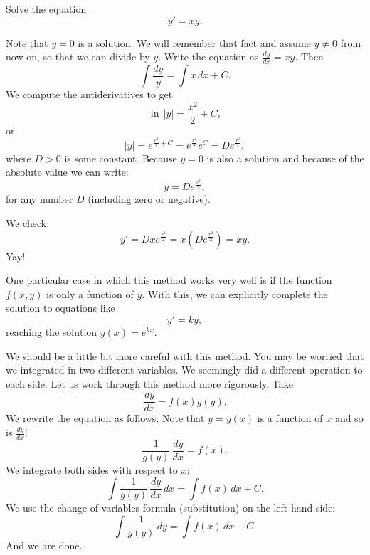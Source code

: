 \documentclass{ximera}
\begin{document}
\begin{example} \label{example:yprimeisxy}
    Solve the equation
    \begin{equation*}
        y' = xy .
    \end{equation*}
\end{example}
\begin{exampleSol}
    Note that $y=0$ is a solution.  We will remember that fact and assume $y \not =0$ from now on, so that we can divide by $y$. Write the equation as $\frac{dy}{dx} = xy$. Then
    \begin{equation*}
        \int \frac{dy}{y} = \int x\,dx + C .
    \end{equation*}
    We compute the antiderivatives to get
    \begin{equation*}
        \ln \, \lvert y\rvert = \frac{x^2}{2} + C ,
    \end{equation*}
    or
    \begin{equation*}
        \lvert y \rvert = e^{\frac{x^2}{2} + C} = e^{\frac{x^2}{2}} e^C = D e^{\frac{x^2}{2}} ,
    \end{equation*}
    where $D > 0$ is some constant.  Because $y=0$ is also a solution and because of the absolute value we can write:
    \begin{equation*}
        y = D e^{\frac{x^2}{2}} ,
    \end{equation*}
    for any number $D$ (including zero or negative).
    
    We check:
    \begin{equation*}
        y' = D x e^{\frac{x^2}{2}} = x \left( D e^{\frac{x^2}{2}} \right) = xy .
    \end{equation*}
    Yay!
\end{exampleSol}

One particular case in which this method works very well is if the function $f(x,y)$ is only a function of $y$. With this, we can explicitly complete the solution to equations like
\begin{equation*}
    y' = ky,
\end{equation*}
reaching the solution $y(x) = e^{kx}$. 

We should be a little bit more careful with this method.  You may be worried that we integrated in two different variables. We seemingly did a different operation to each side.  Let us work through this method more rigorously.  Take
\begin{equation*}
    \frac{dy}{dx} = f(x)g(y) .
\end{equation*}
We rewrite the equation as follows. Note that $y = y(x)$ is a function of $x$ and so is $\frac{dy}{dx}$!
\begin{equation*}
    \frac{1}{g(y)}\,\frac{dy}{dx} = f(x) .
\end{equation*}
We integrate both sides with respect to $x$:
\begin{equation*}
    \int \frac{1}{g(y)}\,\frac{dy}{dx} \,dx = \int f(x) \,dx + C .
\end{equation*}
We use the change of variables formula (substitution) on the left hand side:
\begin{equation*}
    \int \frac{1}{g(y)}\,dy = \int f(x) \,dx + C .
\end{equation*}
And we are done.
\end{document}
